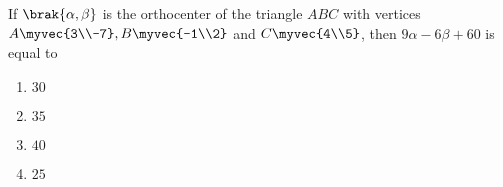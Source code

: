     \item If $\brak{\alpha, \beta}$ is the orthocenter of the triangle $ABC$ with vertices $A\myvec{3\\-7}, B\myvec{-1\\2}$ and $C\myvec{4\\5}$, then $9\alpha - 6\beta + 60$ is equal to
    \hfill{}

	\begin{enumerate}
		\item $30$ 
		\item $35$
		\item $40$
		\item $25$
	\end{enumerate}